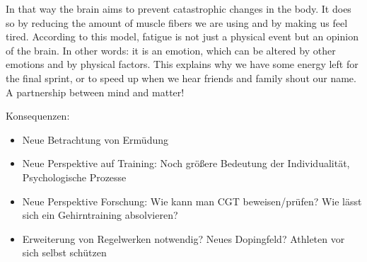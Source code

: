 In that way the brain aims to prevent catastrophic changes in the body.
It does so by reducing the amount of muscle fibers we are using and by making us feel tired.
According to this model, fatigue is not just a physical event but an opinion of the brain.
In other words: it is an emotion, which can be altered by other emotions and by physical factors.
This explains why we have some energy left for the final sprint, or to speed up when we hear friends and family shout our name.
A partnership between mind and matter!

Konsequenzen:
\begin{itemize}
    \item Neue Betrachtung von Ermüdung
    \item Neue Perspektive auf Training: Noch größere Bedeutung der Individualität, Psychologische Prozesse
    \item Neue Perspektive Forschung: Wie kann man CGT beweisen/prüfen? Wie lässt sich ein Gehirntraining absolvieren?
    \item Erweiterung von Regelwerken notwendig? Neues Dopingfeld? Athleten vor sich selbst schützen
\end{itemize}
